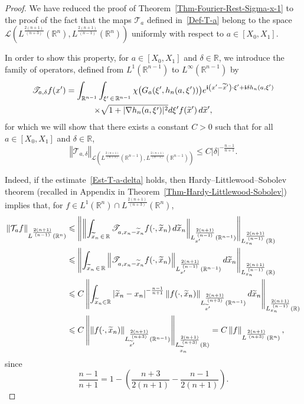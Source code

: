 \documentclass[AHL,Unicode,longabstracts]{cedram}
\newcommand{\scL}{\mathscr{L}}
\newcommand{\scT}{\mathscr{T}}
\newcommand*\R{\mathbb{R}}
\renewcommand{\i}{\mathbf{i}}
\newcommand{\clT}{\mathcal{T}}
\newcommand{\norm}[1]{\left\Vert#1\right\Vert}
\renewcommand{\leq}{\leqslant}
\renewcommand{\tilde}{\widetilde}
\let\oldtilde\tilde
\renewcommand*{\tilde}[1]{\mathchoice{\widetilde{#1}}{\widetilde{#1}}{\oldtilde{#1}}{\oldtilde{#1}}}
\begin{document}
\begin{proof}
We have reduced the proof of Theorem~\ref{Thm-Fourier-Rest-Sigma-x-1} to the proof of the fact that the maps $\clT_a$ defined in~\eqref{Def-T-a} belong to the space $\scL(L^{\frac{2(n+1)}{(n+3)}}(\R^n), L^{\frac{2(n+1)}{(n-1)}}(\R^n))$ uniformly with respect to $a \in [X_0, X_1]$.

In order to show this property, for $a \in [X_0, X_1]$ and $\delta \in \R$, we introduce the family of operators, defined from $L^{1}(\R^{n-1})$ to $L^\infty(\R^{n-1})$ by
\begin{multline*}\label{Def-T-a-delta}
\scT_{a,\delta} f(x') =
\int_{\R^{n-1}}
\int_{\xi'\,\in\,\R^{n-1}}
\chi\big(G_a(\xi', h_n(a,\xi'))\big) e^{\i \left(x' - \tilde x'\right)\cdot \xi' + \i \delta h_n(a,\xi')}
\\
\times
\sqrt{1 + |\nabla h_n(a,\xi')|^2} d \xi' f(\tilde x')
\, d \tilde x',
\end{multline*}
for which we will show that there exists a constant $C>0$ such that for all $a \in [X_0, X_1]$ and $\delta \in \R$,
\begin{equation}\label{Est-T-a-delta}
\norm{ \scT_{a, \delta}}_{\scL\left(L^{\frac{2(n+1)}{(n+3)}}\left(\R^{n-1}\right), L^{\frac{2(n+1)}{(n-1)}}\left(\R^{n-1}\right)\right)}
\leqslant C | \delta|^{-\frac{n-1}{n+1}}.
\end{equation}

Indeed, if the estimate~\eqref{Est-T-a-delta} holds, then Hardy--Littlewood--Sobolev theorem (recalled in Appendix in Theorem~\ref{Thm-Hardy-Littlewood-Sobolev}) implies that, for $f \in L^1(\R^{n}) \cap L^{\frac{2(n+1)}{(n+3)}}(\R^n)$,
\begin{align*}
\norm{ \clT_a f }_{L^{\frac{2(n+1)}{(n-1)}}(\R^n)} &
\leq
\norm{ \norm{ \int_{\tilde x_n\, \in\,\R} \scT_{a, x_n - \tilde x_n } f(\cdot, \tilde x_n) \, d\tilde x_n }_{L^{\frac{2(n+1)}{(n-1)}}_{x'}\left(\R^{n-1}\right)}}_{L^{\frac{2(n+1)}{(n-1)}}_{x_n}(\R)}
\\
&
\leq
\norm{\int_{\tilde x_n\,\in\,\R} \norm{\scT_{a, x_n -\tilde x_n } f(\cdot, \tilde x_n) }_{L^{\frac{2(n+1)}{(n-1)}}_{x'}(\R^{n-1})}d\tilde x_n}_{L^{\frac{2(n+1)}{(n-1)}}_{x_n}(\R)}
\\
&
\leq C \norm{\int_{\tilde x_n \in \R} \left| \tilde x_n - x_n\right|^{-\frac{n-1}{n+1}} \norm{f(\cdot, \tilde x_n) }_{L^{\frac{2(n+1)}{(n+3)}}_{\tilde x'}\left(\R^{n-1}\right)} d\tilde x_n}_{L^{\frac{2(n+1)}{(n-1)}}_{x_n}(\R)}
\\
&
\leq C \norm{ \norm{f(\cdot, \tilde x_n) }_{L^{\frac{2(n+1)}{(n+3)}}_{\tilde x'}\left(\R^{n-1}\right)}}_{L^{\frac{2(n+1)}{(n+3)}}_{\tilde x_n}(\R)} = C \norm{f}_{L^{\frac{2(n+1)}{(n+3)}}\left(\R^n\right)},
\end{align*}
since
\[
\frac{n-1}{n+1} = 1 - \left(\frac{n+3}{2(n+1)} - \frac{n-1}{2(n+1)}\right).
\]


\end{proof}
\end{document}
